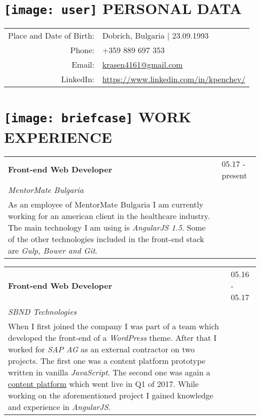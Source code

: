 \documentclass[a4paper,10pt]{article}
\begin{document}
\pagestyle{empty}

\par{
    \centering
    {\Huge{}}
\bigskip\par}

\section{\protect\texttt{[image: user]} PERSONAL DATA}

\begin{tabular}{rl}
    Place and Date of Birth: & Dobrich, Bulgaria | 23.09.1993 \\
    Phone: & +359 889 697 353 \\
    Email: & \href{mailto:krasen4161@gmail.com}{krasen4161@gmail.com} \\
    LinkedIn: & \href{https://www.linkedin.com/in/kpenchev/}{https://www.linkedin.com/in/kpenchev/} \\
    \hline
\end{tabular}

\section{\protect\texttt{[image: briefcase]} WORK EXPERIENCE}

\begin{tabular}{|p{11cm}l}
\textbf{Front-end Web Developer} & 05.17 - present \\
\emph{MentorMate Bulgaria} & \\
\footnotesize{As an employee of MentorMate Bulgaria I am currently working for an american client in the healthcare industry. The main technology I am using is \emph{AngularJS 1.5}. Some of the other technologies included in the front-end stack are \emph{Gulp, Bower and Git}.} & \\ 
\end{tabular}

\begin{tabular}{|p{11cm}l}
\textbf{Front-end Web Developer} & 05.16 - 05.17 \\
\emph{SBND Technologies} & \\ 
\footnotesize{When I first joined the company I was part of a
team which developed the front-end of a \emph{WordPress} theme. After that I worked for \emph{SAP AG} as an external contractor on two projects. The first one was a content platform prototype written in vanilla \emph{JavaScript}. The second one was again a \href{https://help.sap.com/}{content platform} which went live in Q1 of 2017. While working on the aforementioned project I gained knowledge and experience in \emph{AngularJS}.} & \\
\end{tabular}
\end{document}
